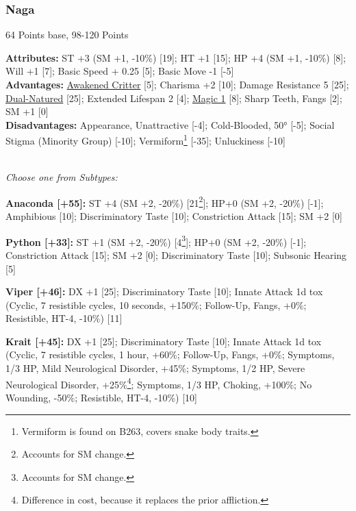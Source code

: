 \begin{multicols*}{3}
	\subsubsection*{Naga}
	\begin{flushright}
		64 Points base, 98-120 Points
	\end{flushright}
	\textbf{Attributes:} 
	ST +3 (SM +1, -10\%) [19]; HT +1 [15]; HP +4 (SM +1, -10\%) [8]; Will +1 [7]; Basic Speed + 0.25 [5]; Basic Move -1 [-5]
	\\\textbf{Advantages:} 
	\hyperref[awakened_critter]{Awakened Critter} [5]; Charisma +2 [10]; Damage Resistance 5 [25]; \hyperref[dual_natured]{Dual-Natured} [25]; Extended Lifespan 2 [4]; \hyperref[magic]{Magic 1} [8]; Sharp Teeth, Fangs [2]; SM +1 [0]
	\\\textbf{Disadvantages:}
	Appearance, Unattractive [-4]; Cold-Blooded, 50° [-5]; Social Stigma (Minority Group) [-10];  Vermiform\footnote{Vermiform is found on B263, covers snake body traits.} [-35]; Unluckiness [-10]
	
	\textit{\\Choose one from Subtypes:}
	
	\textbf{Anaconda [+55]:} ST +4 (SM +2, -20\%) [21\footnote{Accounts for SM change.}]; HP+0 (SM +2, -20\%) [-1]; Amphibious [10]; Discriminatory Taste [10]; Constriction Attack [15]; SM +2 [0]
	
	\textbf{Python [+33]:} ST +1 (SM +2, -20\%) [4\footnote{Accounts for SM change.}]; HP+0 (SM +2, -20\%) [-1]; Constriction Attack [15]; SM +2 [0]; Discriminatory Taste [10]; Subsonic Hearing [5]
		
	\textbf{Viper [+46]:} DX +1 [25]; Discriminatory Taste [10]; Innate Attack 1d tox (Cyclic, 7 resistible cycles, 10 seconds, +150\%; Follow-Up, Fangs, +0\%; Resistible, HT-4, -10\%) [11]
	
	\textbf{Krait [+45]:} DX +1 [25]; Discriminatory Taste [10]; Innate Attack 1d tox (Cyclic, 7 resistible cycles, 1 hour, +60\%; Follow-Up, Fangs, +0\%; Symptoms, 1/3 HP, Mild Neurological Disorder, +45\%; Symptoms, 1/2 HP, Severe Neurological Disorder, +25\%\footnote{Difference in cost, because it replaces the prior affliction.}; Symptoms, 1/3 HP, Choking, +100\%; No Wounding, -50\%; Resistible, HT-4, -10\%) [10]
	

\end{multicols*}
